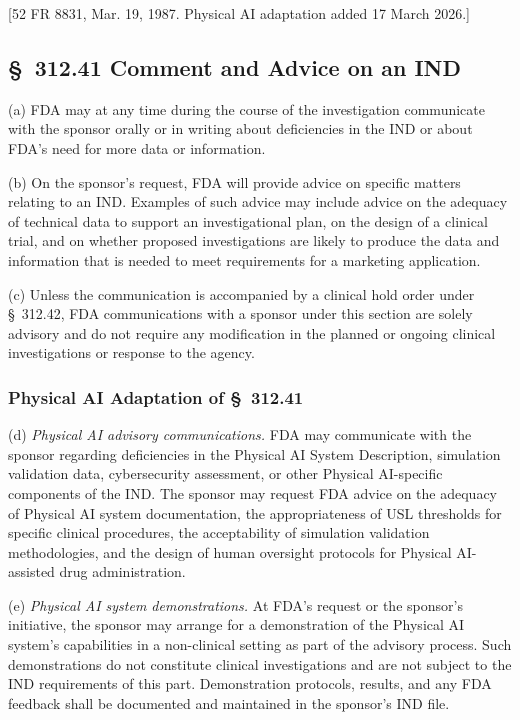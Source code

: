 \documentclass[11pt]{article}
\begin{document}
[52 FR 8831, Mar. 19, 1987. Physical AI adaptation added 17 March 2026.]

\subsection{\S~312.41 Comment and Advice on an IND}

(a) FDA may at any time during the course of the investigation communicate with the sponsor orally or in writing about deficiencies in the IND or about FDA's need for more data or information.

(b) On the sponsor's request, FDA will provide advice on specific matters relating to an IND. Examples of such advice may include advice on the adequacy of technical data to support an investigational plan, on the design of a clinical trial, and on whether proposed investigations are likely to produce the data and information that is needed to meet requirements for a marketing application.

(c) Unless the communication is accompanied by a clinical hold order under \S~312.42, FDA communications with a sponsor under this section are solely advisory and do not require any modification in the planned or ongoing clinical investigations or response to the agency.

\subsubsection{Physical AI Adaptation of \S~312.41}

(d) \textit{Physical AI advisory communications.} FDA may communicate with the sponsor regarding deficiencies in the Physical AI System Description, simulation validation data, cybersecurity assessment, or other Physical AI-specific components of the IND. The sponsor may request FDA advice on the adequacy of Physical AI system documentation, the appropriateness of USL thresholds for specific clinical procedures, the acceptability of simulation validation methodologies, and the design of human oversight protocols for Physical AI-assisted drug administration.

(e) \textit{Physical AI system demonstrations.} At FDA's request or the sponsor's initiative, the sponsor may arrange for a demonstration of the Physical AI system's capabilities in a non-clinical setting as part of the advisory process. Such demonstrations do not constitute clinical investigations and are not subject to the IND requirements of this part. Demonstration protocols, results, and any FDA feedback shall be documented and maintained in the sponsor's IND file.
\end{document}
